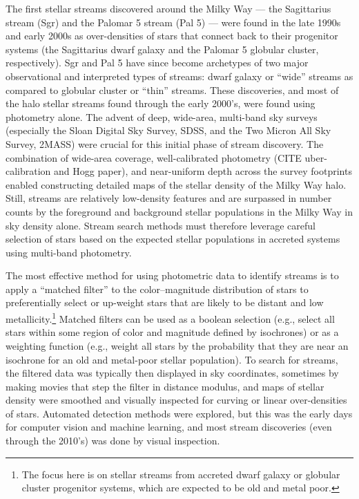 \documentclass[final,5p,times,twocolumn,authoryear]{elsarticle}
\begin{document}
The first stellar streams discovered around the Milky Way --- the Sagittarius stream
(Sgr) and the Palomar 5 stream (Pal 5) --- were found in the late 1990s and early 2000s
as over-densities of stars that connect back to their progenitor systems (the
Sagittarius dwarf galaxy and the Palomar 5 globular cluster, respectively).
Sgr and Pal 5 have since become archetypes of two major observational and interpreted
types of streams: dwarf galaxy or ``wide'' streams as compared to globular cluster or
``thin'' streams.
These discoveries, and most of the halo stellar streams found through the early 2000's,
were found using photometry alone.
The advent of deep, wide-area, multi-band sky surveys (especially the Sloan Digital Sky
Survey, SDSS, and the Two Micron All Sky Survey, 2MASS) were crucial for this initial
phase of stream discovery.
The combination of wide-area coverage, well-calibrated photometry (CITE uber-calibration
and Hogg paper), and near-uniform depth across the survey footprints enabled
constructing detailed maps of the stellar density of the Milky Way halo.
Still, streams are relatively low-density features and are surpassed in number counts by
the foreground and background stellar populations in the Milky Way in sky density alone.
Stream search methods must therefore leverage careful selection of stars based on the
expected stellar populations in accreted systems using multi-band photometry.

The most effective method for using photometric data to identify streams is to apply a
``matched filter'' \citep{rockosi:2002} to the color--magnitude distribution of stars
to preferentially select or up-weight stars that are likely to be distant and low
metallicity.\footnote{The focus here is on stellar streams from accreted dwarf galaxy or
globular cluster progenitor systems, which are expected to be old and metal poor.}
Matched filters can be used as a boolean selection (e.g., select all stars within some
region of color and magnitude defined by isochrones) or as a weighting function (e.g.,
weight all stars by the probability that they are near an isochrone for an old and
metal-poor stellar population).
To search for streams, the filtered data was typically then displayed in sky
coordinates, sometimes by making movies that step the filter in distance modulus, and
maps of stellar density were smoothed and visually inspected for curving or linear
over-densities of stars.
Automated detection methods were explored, but this was the early days for computer
vision and machine learning, and most stream discoveries (even through the 2010's) was
done by visual inspection.
\end{document}
